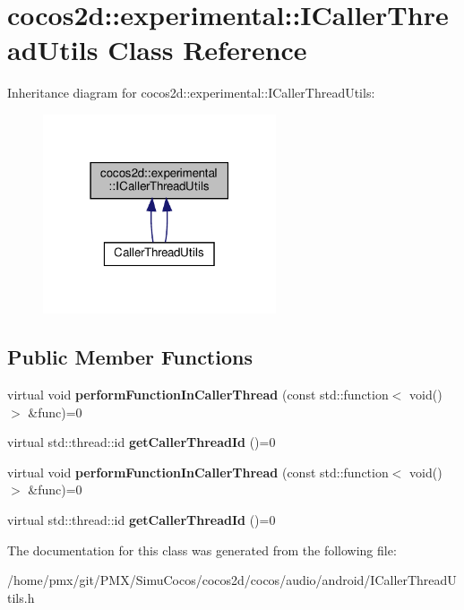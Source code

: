 \hypertarget{classcocos2d_1_1experimental_1_1ICallerThreadUtils}{}\section{cocos2d\+:\+:experimental\+:\+:I\+Caller\+Thread\+Utils Class Reference}
\label{classcocos2d_1_1experimental_1_1ICallerThreadUtils}


Inheritance diagram for cocos2d\+:\+:experimental\+:\+:I\+Caller\+Thread\+Utils\+:
\nopagebreak
\begin{figure}[H]
\begin{center}
\leavevmode
\includegraphics[width=195pt]{classcocos2d_1_1experimental_1_1ICallerThreadUtils__inherit__graph}
\end{center}
\end{figure}
\subsection*{Public Member Functions}
\begin{DoxyCompactItemize}
\item 
\mbox{\label{classcocos2d_1_1experimental_1_1ICallerThreadUtils_aea064161793d1f379f535ea53e0bcdf2}} 
virtual void {\bfseries perform\+Function\+In\+Caller\+Thread} (const std\+::function$<$ void()$>$ \&func)=0
\item 
\mbox{\label{classcocos2d_1_1experimental_1_1ICallerThreadUtils_adc7a2d2ae14bb07c8af4d0369fbbe8b3}} 
virtual std\+::thread\+::id {\bfseries get\+Caller\+Thread\+Id} ()=0
\item 
\mbox{\label{classcocos2d_1_1experimental_1_1ICallerThreadUtils_aea064161793d1f379f535ea53e0bcdf2}} 
virtual void {\bfseries perform\+Function\+In\+Caller\+Thread} (const std\+::function$<$ void()$>$ \&func)=0
\item 
\mbox{\label{classcocos2d_1_1experimental_1_1ICallerThreadUtils_adc7a2d2ae14bb07c8af4d0369fbbe8b3}} 
virtual std\+::thread\+::id {\bfseries get\+Caller\+Thread\+Id} ()=0
\end{DoxyCompactItemize}


The documentation for this class was generated from the following file\+:\begin{DoxyCompactItemize}
\item 
/home/pmx/git/\+P\+M\+X/\+Simu\+Cocos/cocos2d/cocos/audio/android/I\+Caller\+Thread\+Utils.\+h\end{DoxyCompactItemize}
